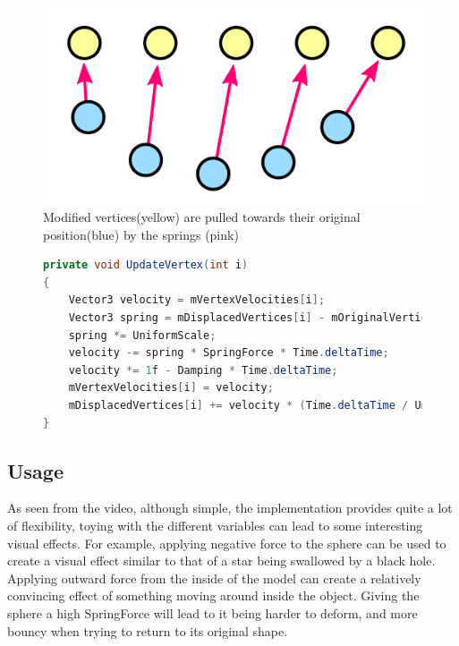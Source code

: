 \begin{figure}
    \includegraphics[width=\textwidth]{report/figures/catlike_mesh_deformation_springs.png}
    \caption{Modified vertices(yellow) are pulled towards their original position(blue) by the springs (pink)\cite{catlike_mesh_deformation}}
    \label{fig:catlike_mesh_deformation_springs}
\end{figure}

\begin{figure}
\begin{lstlisting}[label={code:catlike_mesh_deformation_update},language=csharp,caption={Catlike coding mesh deformation vertex update}]
private void UpdateVertex(int i)
{
    Vector3 velocity = mVertexVelocities[i];
    Vector3 spring = mDisplacedVertices[i] - mOriginalVertices[i];
    spring *= UniformScale;
    velocity -= spring * SpringForce * Time.deltaTime;
    velocity *= 1f - Damping * Time.deltaTime;
    mVertexVelocities[i] = velocity;
    mDisplacedVertices[i] += velocity * (Time.deltaTime / UniformScale);
}
\end{lstlisting}
\end{figure}

\subsection{Usage}
As seen from the video, although simple, the implementation provides quite a lot of flexibility, toying with the different variables
can lead to some interesting visual effects.
For example, applying negative force to the sphere can be used to create a visual effect similar to that of a star being swallowed by a black hole.
Applying outward force from the inside of the model can create a relatively convincing effect of something moving around inside the object.
Giving the sphere a high SpringForce will lead to it being harder to deform, and more bouncy when trying to return to its original shape.

